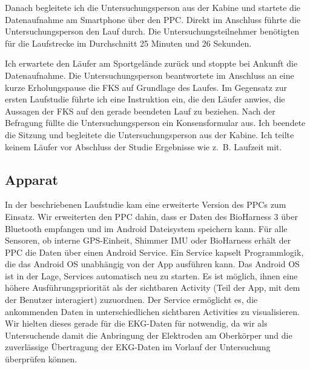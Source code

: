 Danach begleitete ich die Untersuchungsperson aus der Kabine und startete die Datenaufnahme am Smartphone über den \ac{PPC}. Direkt im Anschluss führte die Untersuchungsperson den Lauf durch. Die Untersuchungsteilnehmer benötigten für die Laufstrecke im Durchschnitt 25 Minuten und 26 Sekunden. 

Ich erwartete den Läufer am Sportgelände zurück und stoppte bei Ankunft die Datenaufnahme. Die Untersuchungsperson beantwortete im Anschluss an eine kurze Erholungspause die \ac{FKS} auf Grundlage des Laufes. Im Gegensatz zur ersten Laufstudie führte ich eine Instruktion ein, die den Läufer anwies, die Aussagen der \ac{FKS} auf den gerade beendeten Lauf zu beziehen. Nach der Befragung füllte die Untersuchungsperson ein Konsensformular aus. Ich beendete die Sitzung und begleitete die Untersuchungsperson aus der Kabine. Ich teilte keinem Läufer vor Abschluss der Studie Ergebnisse wie z.~B. Laufzeit mit. 

\subsection{Apparat} 

\label{sub:apparat}

In der beschriebenen Laufstudie kam eine erweiterte Version des \ac{PPC}s zum Einsatz. Wir erweiterten den \ac{PPC} dahin, dass er Daten des BioHarness 3 über Bluetooth empfangen und im Android Dateisystem speichern kann. Für alle Sensoren, ob interne \acs{GPS}-Einheit, Shimmer \ac{IMU} oder BioHarness erhält der \ac{PPC} die Daten über einen Android Service. Ein Service kapselt Programmlogik, die das Android OS unabhängig von der App ausführen kann. Das Android OS ist in der Lage, Services automatisch neu zu starten. Es ist möglich, ihnen eine höhere Ausführungspriorität als der sichtbaren Activity (Teil der App, mit dem der Benutzer interagiert) zuzuordnen. Der Service ermöglicht es, die ankommenden Daten in unterschiedlichen sichtbaren Activities zu visualisieren. Wir hielten dieses gerade für die \ac{EKG}-Daten für notwendig, da wir als Untersuchende damit die Anbringung der Elektroden am Oberkörper und die zuverlässige Übertragung der \ac{EKG}-Daten im Vorlauf der Untersuchung überprüfen können. 

